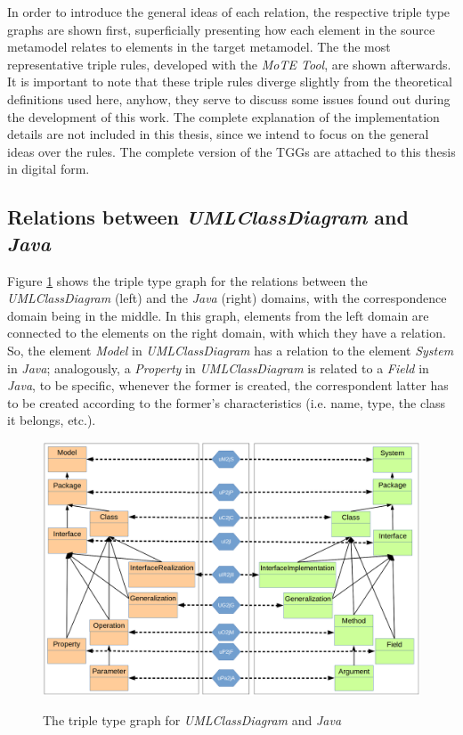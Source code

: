 \documentclass[tuberlin,cic,tc,english,noabntcite, oneside]{iiufrgs}
\begin{document}
In order to introduce the general ideas of each relation, the respective triple type graphs are shown first, superficially presenting how each element in the source metamodel relates to elements in the target metamodel. The the most representative triple rules, developed with the \emph{MoTE Tool}, are shown afterwards. It is important to note that these triple rules diverge slightly from the theoretical definitions used here, anyhow, they serve to discuss some issues found out during the development of this work. The complete explanation of the implementation details are not included in this thesis, since we intend to focus on the general ideas over the rules. The complete version of the TGGs are attached to this thesis in digital form.

\subsection{Relations between \emph{UMLClassDiagram} and \emph{Java}}
\label{subsec:umlClassDiagram2Java}
Figure \ref{fig:umlClassDiagram2java_type} shows the triple type graph for the relations between the \emph{UMLClassDiagram} (left) and the \emph{Java} (right) domains, with the correspondence domain being in the middle. In this graph, elements from the left domain are connected to the elements on the right domain, with which they have a relation. So, the element \emph{Model} in \emph{UMLClassDiagram} has a relation to the element \emph{System} in \emph{Java}; analogously, a \emph{Property} in \emph{UMLClassDiagram} is related to a \emph{Field} in \emph{Java}, to be specific, whenever the former is created, the correspondent latter has to be created according to the former's characteristics (i.e. name, type, the class it belongs, etc.).

\begin{figure}[H]
	\centering
    \caption{The triple type graph for \emph{UMLClassDiagram} and \emph{Java}}
    \includegraphics[width=.7\textwidth]{umlClassDiagram2java_type}
    \label{fig:umlClassDiagram2java_type}
\end{figure}
\end{document}
